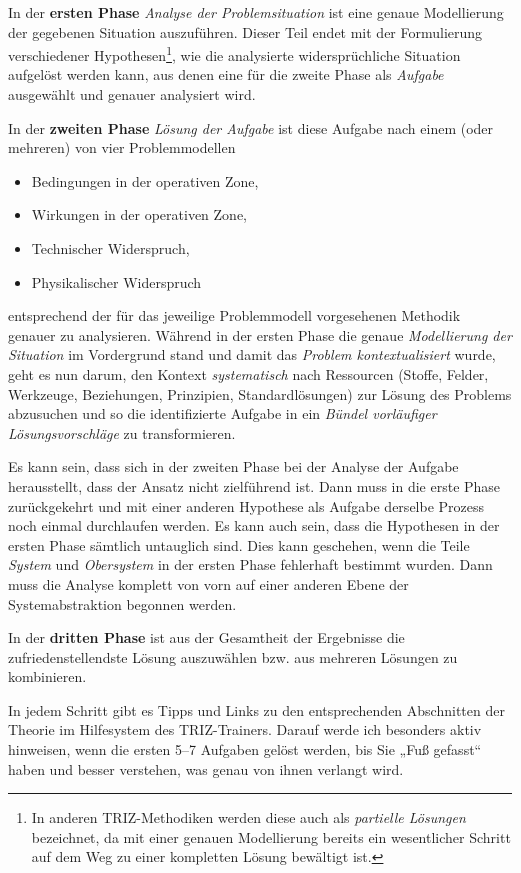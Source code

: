\documentclass[11pt,a4paper]{article}
\begin{document}
In der \textbf{ersten Phase} \emph{Analyse der Problemsituation} ist eine
genaue Modellierung der gegebenen Situation auszuführen.  Dieser Teil endet
mit der Formulierung verschiedener Hypothesen\footnote{In anderen
  TRIZ-Methodiken werden diese auch als \emph{partielle Lösungen} bezeichnet,
  da mit einer genauen Modellierung bereits ein wesentlicher Schritt auf dem
  Weg zu einer kompletten Lösung bewältigt ist.}, wie die analysierte
widersprüchliche Situation aufgelöst werden kann, aus denen eine für die
zweite Phase als \emph{Aufgabe} ausgewählt und genauer analysiert wird.

In der \textbf{zweiten Phase} \emph{Lösung der Aufgabe} ist diese Aufgabe nach
einem (oder mehreren) von vier Problemmodellen
\begin{itemize}\itemsep0pt
\item Bedingungen in der operativen Zone,
\item Wirkungen in der operativen Zone, 
\item Technischer Widerspruch,
\item Physikalischer Widerspruch
\end{itemize}
entsprechend der für das jeweilige Problemmodell vorgesehenen Methodik genauer
zu analysieren.  Während in der ersten Phase die genaue \emph{Modellierung der
  Situation} im Vordergrund stand und damit das \emph{Problem
  kontextualisiert} wurde, geht es nun darum, den Kontext \emph{systematisch}
nach Ressourcen (Stoffe, Felder, Werkzeuge, Beziehungen, Prinzipien,
Standardlösungen) zur Lösung des Problems abzusuchen und so die identifizierte
Aufgabe in ein \emph{Bündel vorläufiger Lösungsvorschläge} zu transformieren.

Es kann sein, dass sich in der zweiten Phase bei der Analyse der Aufgabe
herausstellt, dass der Ansatz nicht zielführend ist. Dann muss in die erste
Phase zurückgekehrt und mit einer anderen Hypothese als Aufgabe derselbe
Prozess noch einmal durchlaufen werden.  Es kann auch sein, dass die
Hypothesen in der ersten Phase sämtlich untauglich sind.  Dies kann geschehen,
wenn die Teile \emph{System} und \emph{Obersystem} in der ersten Phase
fehlerhaft bestimmt wurden. Dann muss die Analyse komplett von vorn auf einer
anderen Ebene der Systemabstraktion begonnen werden.

In der \textbf{dritten Phase} ist aus der Gesamtheit der Ergebnisse die
zufriedenstellendste Lösung auszuwählen bzw.  aus mehreren Lösungen zu
kombinieren.

In jedem Schritt gibt es Tipps und Links zu den entsprechenden Abschnitten der
Theorie im Hilfesystem des TRIZ-Trainers.  Darauf werde ich besonders aktiv
hinweisen, wenn die ersten 5--7 Aufgaben gelöst werden, bis Sie „Fuß gefasst“
haben und besser verstehen, was genau von ihnen verlangt wird.
\end{document}
